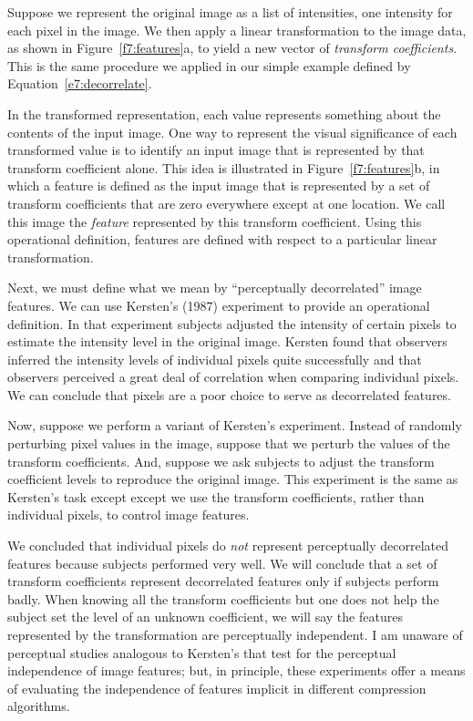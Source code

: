 Suppose we represent the original image as a list of intensities, one
intensity for each pixel in the image.  We then apply a linear
transformation to the image data, as shown in
Figure~\ref{f7:features}a, to yield a new vector of {\em transform
coefficients}.  This is the same procedure we applied in our simple
example defined by Equation~\ref{e7:decorrelate}.

In the transformed representation, each value represents something
about the contents of the input image.  One way to represent the
visual significance of each transformed value is to identify an input
image that is represented by that transform coefficient alone.  This
idea is illustrated in Figure~\ref{f7:features}b, in which a feature is defined
as the input image that is represented by a set of transform
coefficients that are zero everywhere except at one location.  We call
this image the {\em feature} represented by this transform coefficient.
Using this operational definition, features are defined with respect
to a particular linear transformation.

Next, we must define what we mean by ``perceptually decorrelated'' image
features.  We can use Kersten's (1987) experiment to provide an
operational definition.  In that experiment subjects adjusted the
intensity of certain pixels to estimate the intensity level in the
original image.  Kersten found that observers inferred the intensity
levels of individual pixels quite successfully and that observers
perceived a great deal of correlation when comparing individual
pixels.  We can conclude that pixels are a poor choice to serve as
decorrelated features.

Now, suppose we perform a variant of Kersten's experiment.  Instead of
randomly perturbing pixel values in the image, suppose that we perturb
the values of the transform coefficients.  And, suppose we ask
subjects to adjust the transform coefficient levels to reproduce the
original image.  This experiment is the same as Kersten's task except
except we use the transform coefficients, rather than individual
pixels, to control image features.

We concluded that individual pixels do {\em not} represent
perceptually decorrelated features because subjects performed very
well.  We will conclude that a set of transform coefficients represent
decorrelated features only if subjects perform badly.  When knowing
all the transform coefficients but one does not help the subject set
the level of an unknown coefficient, we will say the features
represented by the transformation are perceptually independent.  I am
unaware of perceptual studies analogous to Kersten's that test for the
perceptual independence of image features; but, in principle, these
experiments offer a means of evaluating the independence of features
implicit in different compression algorithms.

